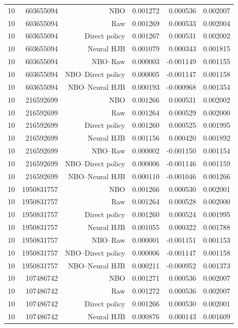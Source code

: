 \begin{longtable}{lrrrrr}
10 & 603655094 & NBO & 0.001272 & 0.000536 & 0.002007 \\
10 & 603655094 & Raw & 0.001269 & 0.000533 & 0.002004 \\
10 & 603655094 & Direct policy & 0.001267 & 0.000531 & 0.002002 \\
10 & 603655094 & Neural HJB & 0.001079 & 0.000343 & 0.001815 \\
10 & 603655094 & NBO--Raw & 0.000003 & -0.001149 & 0.001155 \\
10 & 603655094 & NBO--Direct policy & 0.000005 & -0.001147 & 0.001158 \\
10 & 603655094 & NBO--Neural HJB & 0.000193 & -0.000968 & 0.001354 \\
10 & 216592699 & NBO & 0.001266 & 0.000531 & 0.002002 \\
10 & 216592699 & Raw & 0.001264 & 0.000529 & 0.002000 \\
10 & 216592699 & Direct policy & 0.001260 & 0.000525 & 0.001995 \\
10 & 216592699 & Neural HJB & 0.001156 & 0.000420 & 0.001892 \\
10 & 216592699 & NBO--Raw & 0.000002 & -0.001150 & 0.001154 \\
10 & 216592699 & NBO--Direct policy & 0.000006 & -0.001146 & 0.001159 \\
10 & 216592699 & NBO--Neural HJB & 0.000110 & -0.001046 & 0.001266 \\
10 & 1950831757 & NBO & 0.001266 & 0.000530 & 0.002001 \\
10 & 1950831757 & Raw & 0.001264 & 0.000528 & 0.002000 \\
10 & 1950831757 & Direct policy & 0.001260 & 0.000524 & 0.001995 \\
10 & 1950831757 & Neural HJB & 0.001055 & 0.000322 & 0.001788 \\
10 & 1950831757 & NBO--Raw & 0.000001 & -0.001151 & 0.001153 \\
10 & 1950831757 & NBO--Direct policy & 0.000006 & -0.001147 & 0.001158 \\
10 & 1950831757 & NBO--Neural HJB & 0.000211 & -0.000952 & 0.001373 \\
10 & 107486742 & NBO & 0.001271 & 0.000536 & 0.002007 \\
10 & 107486742 & Raw & 0.001272 & 0.000536 & 0.002007 \\
10 & 107486742 & Direct policy & 0.001266 & 0.000530 & 0.002001 \\
10 & 107486742 & Neural HJB & 0.000876 & 0.000143 & 0.001609 \\

\end{longtable}
